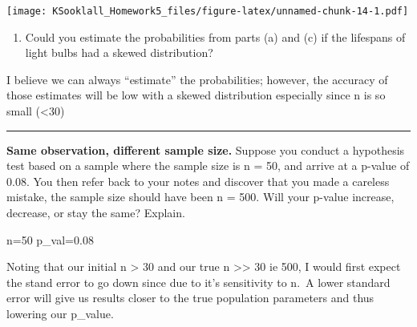\documentclass[
]{article}
\newenvironment{Shaded}{\begin{snugshade}}{\end{snugshade}}
\newcommand{\DataTypeTok}[1]{\textcolor[rgb]{0.13,0.29,0.53}{#1}}
\newcommand{\DecValTok}[1]{\textcolor[rgb]{0.00,0.00,0.81}{#1}}
\newcommand{\KeywordTok}[1]{\textcolor[rgb]{0.13,0.29,0.53}{\textbf{#1}}}
\newcommand{\NormalTok}[1]{#1}
\newcommand{\OperatorTok}[1]{\textcolor[rgb]{0.81,0.36,0.00}{\textbf{#1}}}
\newcommand{\StringTok}[1]{\textcolor[rgb]{0.31,0.60,0.02}{#1}}
\providecommand{\tightlist}{%
  \setlength{\itemsep}{0pt}\setlength{\parskip}{0pt}}
\begin{document}
\begin{Shaded}
\end{Shaded}

\texttt{[image: KSooklall\_Homework5\_files/figure-latex/unnamed-chunk-14-1.pdf]}

\begin{enumerate}
\def\labelenumi{(\alph{enumi})}
\setcounter{enumi}{4}
\tightlist
\item
  Could you estimate the probabilities from parts (a) and (c) if the
  lifespans of light bulbs had a skewed distribution?
\end{enumerate}

I believe we can always ``estimate'' the probabilities; however, the
accuracy of those estimates will be low with a skewed distribution
especially since n is so small (\textless30)

\begin{center}\rule{0.5\linewidth}{0.5pt}\end{center}

\clearpage

\textbf{Same observation, different sample size.} Suppose you conduct a
hypothesis test based on a sample where the sample size is n = 50, and
arrive at a p-value of 0.08. You then refer back to your notes and
discover that you made a careless mistake, the sample size should have
been n = 500. Will your p-value increase, decrease, or stay the same?
Explain.

n=50 p\_val=0.08

Noting that our initial n \textgreater{} 30 and our true n
\textgreater\textgreater{} 30 ie 500, I would first expect the stand
error to go down since due to it's sensitivity to n.~A lower standard
error will give us results closer to the true population parameters and
thus lowering our p\_value.
\end{document}
